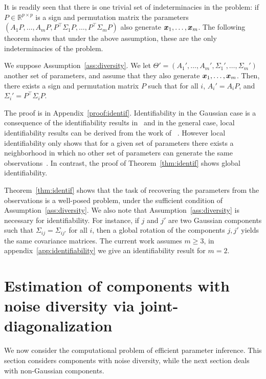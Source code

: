 It is readily seen that there is one trivial set of indeterminacies in the problem: if $P \in \mathbb{R}^{p \times p}$ is a sign and permutation matrix the parameters $(A_1 P, \dots, A_m P, P^{\top}\Sigma_1 P, \dots, P^{\top} \Sigma_m P)$ also generate $\boldsymbol{x}_1,\dots, \boldsymbol{x}_m$. The following theorem shows that under the above assumption, these are the only indeterminacies of the problem.

\begin{theorem}[Identifiability]
\label{thm:identif}
We suppose Assumption~\ref{ass:diversity}. We let $\Theta'=(A_1', \dots, A_m', \Sigma_1', \dots,\Sigma_m')$ another set of parameters, and assume that they also generate $\boldsymbol{x}_1,\dots, \boldsymbol{x}_m$. Then, there exists a sign and permutation matrix $P$ such that for all $i$, $A_i'=A_iP$, and $\Sigma_i'= P^{\top} \Sigma_i P$.
\end{theorem}
The proof is in Appendix~\ref{proof:identif}. Identifiability in the Gaussian case is a consequence of the identifiability results in~\cite{via2011joint} and in the general case, local identifiability results can be derived from the work of ~\cite{anderson2014independent}. 
%
However local identifiability only shows that for a given set of parameters there exists a neighborhood in which no other set of parameters can generate the same observations~\cite{rothenberg1971identification}. In contrast, the proof of Theorem~\ref{thm:identif} shows global identifiability.

Theorem~\ref{thm:identif} shows that the task of recovering the parameters from the observations is a well-posed problem, under the sufficient condition of Assumption~\ref{ass:diversity}.  We also note that Assumption~\ref{ass:diversity} is necessary for identifiability. For instance, if $j$ and $j'$ are two Gaussian components such that $\Sigma_{ij} = \Sigma_{ij'}$ for all $i$, then a global rotation of the components $j, j'$ yields the same covariance matrices. The current work assumes $m \geq 3$, in appendix~\ref{app:identifiability} we give an identifiability result for $m=2$.



\section{Estimation of components with noise diversity via joint-diagonalization}

We now consider the computational problem of efficient parameter inference. This section considers components with noise diversity, while the next section deals with non-Gaussian components.


